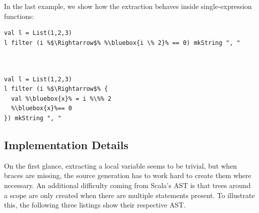 \documentclass[10pt,a4paper,oneside]{scrreprt}
\begin{document}
In the last example, we show how the extraction behaves inside single-expression functions:

\begin{multicols}{2}
\begin{lstlisting}
val l = List(1,2,3)
l filter (i %$\Rightarrow$% %\bluebox{i \% 2}% == 0) mkString ", "



\end{lstlisting}
\begin{lstlisting}
val l = List(1,2,3) 
l filter (i %$\Rightarrow$% {
  val %\bluebox{x}% = i %\%% 2 
  %\bluebox{x}%== 0
}) mkString ", "
\end{lstlisting}
\end{multicols}

\subsection{Implementation Details}

On the first glance, extracting a local variable seems to be trivial, but when braces are missing, the source generation has to work hard to create them where necessary. An additional difficulty coming from Scala's AST is that  trees around a scope are only created when there are multiple statements present. To illustrate this, the following three listings show their respective AST.
\end{document}
